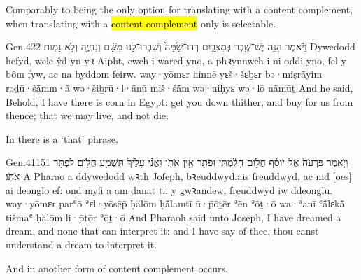 
\begin{paper}
	Comparably to  being the only option for translating  with a content complement, when translating  with a \hl{content complement} only  is selectable.
\end{paper}

\begin{example}{Gen.}{42}{2}{}{}
	\quoling
	{וַיֹּ֕אמֶר הִנֵּ֣ה   יֶשׁ־שֶׁ֖בֶר בְּמִצְרָ֑יִם רְדוּ־שָׁ֙מָּה֙ וְשִׁבְרוּ־לָ֣נוּ מִשָּׁ֔ם וְנִחְיֶ֖ה וְלֹ֥א נָמֽוּת׃}
	{Dywedodd hefyd, wele   ŷd yn yꝛ Aipht, ewch i wared yno, a phꝛynnwch i ni oddi yno, fel y bôm fyw, ac na byddom feirw.}
	{way·yōmɛr hinnē   yɛš·šɛḇɛr bə·miṣrå̄yim rəḏū·šå̄mm·å̄ wə·šiḇrū·l·å̄nū miš·šå̄m wə·niḥyɛ wə·lō nå̄mūṯ}
	{And he said, Behold, I have   there is corn in Egypt: get you down thither, and buy for us from thence; that we may live, and not die.}
\end{example}
\begin{paper}
	\begin{leftbar}
		\explain In  there is a  ‘that’ phrase.
	\end{leftbar}
\end{paper}

\begin{example}{Gen.}{41}{15}{1}{}
	\quoling
	{וַיֹּ֤אמֶר פַּרְעֹה֙ אֶל־יֹוסֵ֔ף חֲלֹ֣ום חָלַ֔מְתִּי וּפֹתֵ֖ר אֵ֣ין אֹתֹ֑ו וַאֲנִ֗י  עָלֶ֙יךָ֙  תִּשְׁמַ֥ע חֲלֹ֖ום לִפְתֹּ֥ר אֹתֹֽו׃}
	{A Pharao a ddywedodd wꝛth Joſeph, bꝛeuddwydiais freuddwyd, ac nid [oes] ai deonglo ef: ond myfi a   am danat ti, y gwꝛandewi freuddwyd iw ddeonglu.}
	{way·yōmɛr parʿō ʾɛl·yōsēp̄ ḥălōm ḥå̄lamtī ū·p̄ōṯēr ʾēn ʾōṯ·ō wa·ʾănī  ʿå̄lɛḵå̄  tišmaʿ ḥălōm li·p̄tōr ʾōṯ·ō}
	{And Pharaoh said unto Joseph, I have dreamed a dream, and  none that can interpret it: and I have  say of thee,  thou canst understand a dream to interpret it.}
\end{example}
\begin{paper}
	\begin{leftbar}
		\explain And in  another form of content complement occurs.
	\end{leftbar}
\end{paper}



